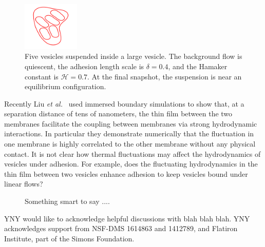 \documentclass[prf,superscriptaddress,showpacs]{revtex4-1}
\begin{document}
\begin{figure}[htp]
  \includegraphics[width=0.24\textwidth]{figs/relaxationManyVes_Snapshot08.pdf}
  \caption{\label{fig:relaxationManyVes} Five vesicles suspended inside
  a large vesicle.  The background flow is quiescent, the adhesion
  length scale is $\delta = 0.4$, and the Hamaker constant is
  $\mathcal{H} = 0.7$.  At the final snapshot, the suspension is near an
  equilibrium configuration.}
\end{figure}

Recently Liu {\em et al.}~\cite{LiuChuNewbyRead2018_bioRxiv} used
immersed boundary simulations to show that, at a separation distance of
tens of nanometers, the thin film between the two membranes facilitate
the coupling between membranes via strong hydrodynamic interactions. In
particular they demonstrate numerically that the fluctuation in one
membrane is highly correlated to the other membrane without any physical
contact. It is not clear how thermal fluctuations may affect the
hydrodynamics of vesicles under adhesion. For example, does the
fluctuating hydrodynamics in the thin film between two vesicles enhance
adhesion to keep vesicles bound under linear flows?

\begin{figure}[htp]
\caption{\label{fig:relaxationManyVesAdhesionTension} Something smart to
say ....}
\end{figure}



\acknowledgments

YNY would like to acknowledge helpful discussions with blah blah blah.
YNY acknowledges support from NSF-DMS 1614863 and 1412789, and Flatiron Institute, part of the Simons Foundation.
\end{document}
